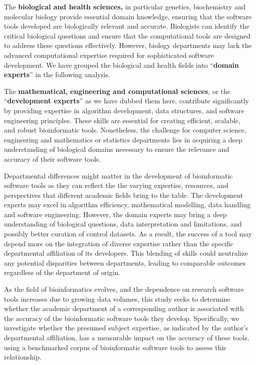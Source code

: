 \documentclass[fleqn,10pt,doc,onecolumn]{SelfArx}%
\begin{document}
The \textbf{biological and health sciences,} in particular genetics,
biochemistry and molecular biology provide essential domain knowledge,
ensuring that the software tools developed are biologically relevant
and accurate.  Biologists can identify the critical biological
questions and ensure that the computational tools are designed to
address these questions effectively. However, biology departments may
lack the advanced computational expertise required for sophisticated
software development. We have grouped the biological and health fields
into ``\textbf{domain experts}'' in the following analysis.

The \textbf{mathematical, engineering and computational sciences}, or
the ``\textbf{development experts}'' as we have dubbed them here,
contribute significantly by providing expertise in algorithm
development, data structures, and software engineering
principles. These skills are essential for creating efficient,
scalable, and robust bioinformatic tools. Nonetheless, the challenge
for computer science, engineering and mathematics or statistics
departments lies in acquiring a deep understanding of biological
domains necessary to ensure the relevance and accuracy of their
software tools.

Departmental differences might matter in the development of
bioinformatic software tools as they can reflect the the varying
expertise, resources, and perspectives that different academic fields
bring to the table. The development experts may excel in algorithm
efficiency, mathematical modelling, data handling and software engineering. However,
the domain experts may bring a deep understanding of biological
questions, data interpretation and limitations, and possibly better
curation of control datasets. As a result, the success of a tool may
depend more on the integration of diverse expertise rather than the
specific departmental affiliation of its developers. This blending of
skills could neutralize any potential disparities between departments,
leading to comparable outcomes regardless of the department of origin.

As the field of bioinformatics evolves, and the dependence on research
software tools increases due to growing data volumes, this study seeks
to determine whether the academic department of a corresponding author
is associated with the accuracy of the bioinformatic software tools
they develop. Specifically, we investigate whether the presumed
subject expertise, as indicated by the author's departmental
affiliation, has a measurable impact on the accuracy of these tools,
using a benchmarked corpus of bioinformatic software tools to assess
this relationship.
\end{document}
